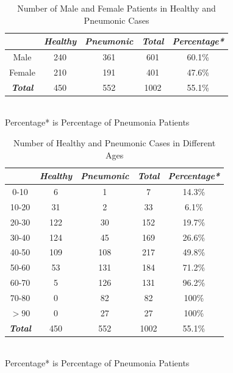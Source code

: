 \documentclass[journal]{IEEEtran}
\begin{document}
\begin{table}[htb]
    \vspace{-0cm}
    \caption{Number of Male and Female Patients in Healthy and Pneumonic Cases}
    \vspace{-0cm}
    \begin{center}
    \begin{tabular}{|c|c|c|c|c|}
    \hline
    \textbf{\textit{}} & \textbf{\textit{Healthy}} & \textbf{\textit{Pneumonic}}& \textbf{\textit{Total}}& \textbf{\textit{Percentage*}} \\
    \hline
    Male & 240 & 361 & 601 & 60.1\%\\
    Female & 210 & 191 & 401 &47.6\% \\
    \hline
    \textbf{\textit{Total}} & 450 & 552 & 1002 & 55.1\% \\
    
    \hline
    \end{tabular}
    \vspace{0.1cm}
    \label{malefemale} \\
    \footnotesize{Percentage* is Percentage of Pneumonia Patients}

    \end{center}

    \vspace{-0.0cm}
    \end{table}

\begin{table}[htb]
    \vspace{-0cm}
    \caption{Number of Healthy and Pneumonic Cases in Different Ages}
    \vspace{-0cm}
    \begin{center}
    \begin{tabular}{|c|c|c|c|c|}
        \hline
        \textbf{\textit{}} & \textbf{\textit{Healthy}} & \textbf{\textit{Pneumonic}}& \textbf{\textit{Total}}& \textbf{\textit{Percentage*}} \\
    \hline
    0-10 & 6 & 1 & 7 & 14.3\%\\
    10-20 & 31 & 2 & 33 & 6.1\%\\
    20-30 & 122 & 30 & 152 & 19.7\%\\
    30-40 & 124 & 45 & 169 &26.6\%\\
    40-50 & 109 & 108 & 217 &49.8\%\\
    50-60 & 53 & 131 & 184 &71.2\%\\
    60-70 & 5 & 126 & 131 &96.2\%\\
    70-80 & 0 & 82 & 82 &100\%\\
    $>90$& 0 & 27 & 27 &100\%\\
    \hline 
    \textbf{\textit{Total}} & 450 & 552 & 1002 & 55.1\% \\
    
    \hline
    \end{tabular}
    \vspace{0.1cm}
    \label{differentages}\\
    \footnotesize{Percentage* is Percentage of Pneumonia Patients}

    \end{center}
    \vspace{-0.0cm}
    \end{table}
\end{document}
